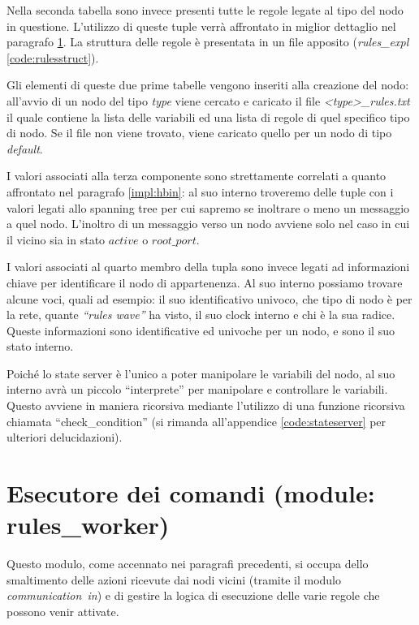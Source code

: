 \documentclass[italian]{memoir}
\begin{document}
Nella seconda tabella sono invece presenti tutte le regole legate al tipo del nodo in questione. L'utilizzo di queste tuple verrà affrontato in miglior dettaglio nel paragrafo \ref{impl:rules_worker}.
La struttura delle regole è presentata in un file apposito (\textit{rules\_expl} \ref{code:rulesstruct}). %

Gli elementi di queste due prime tabelle vengono inseriti alla creazione del nodo: all'avvio di un nodo del tipo \textit{type} viene cercato e caricato il file \textit{<type>\_rules.txt} il quale contiene la lista delle variabili ed una lista di regole di quel specifico tipo di nodo. Se il file non viene trovato, viene caricato quello per un nodo di tipo \textit{default}.

I valori associati alla terza componente sono strettamente correlati a quanto affrontato nel paragrafo \ref{impl:hbin}: al suo interno troveremo delle tuple con i valori legati allo spanning tree per cui sapremo se inoltrare o meno un messaggio a quel nodo. L'inoltro di un messaggio verso un nodo avviene solo nel caso in cui il vicino sia in stato $active$ o $root\_port$.

I valori associati al quarto membro della tupla sono invece legati ad informazioni chiave per identificare il nodo di appartenenza. Al suo interno possiamo trovare alcune voci, quali ad esempio: il suo identificativo univoco, che tipo di nodo è per la rete, quante \textit{``rules wave''} ha visto, il suo clock interno e chi è la sua radice. Queste informazioni sono identificative ed univoche per un nodo, e sono il suo stato interno.

Poiché lo state server è l'unico a poter manipolare le variabili del nodo, al suo interno avrà un piccolo ``interprete'' per manipolare e controllare le variabili. Questo avviene in maniera ricorsiva mediante l'utilizzo di una funzione ricorsiva chiamata ``check\_condition'' (si rimanda all'appendice \ref{code:stateserver} per ulteriori delucidazioni).

\section{Esecutore dei comandi (module: rules\_worker)}\label{impl:rules_worker}

Questo modulo, come accennato nei paragrafi precedenti, si occupa dello smaltimento delle azioni ricevute dai nodi vicini (tramite il modulo \textit{communication~in}) e di gestire la logica di esecuzione delle varie regole che possono venir attivate.
\end{document}

